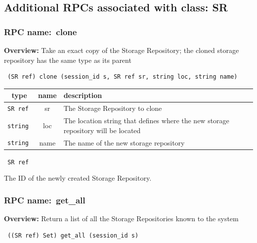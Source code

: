 \subsection{Additional RPCs associated with class: SR}
\subsubsection{RPC name:~clone}

{\bf Overview:} 
Take an exact copy of the Storage Repository;
        the cloned storage repository has the same type as its parent

\begin{verbatim} (SR ref) clone (session_id s, SR ref sr, string loc, string name)\end{verbatim}



 
\vspace{0.3cm}
\begin{tabular}{|c|c|p{7cm}|}
 \hline
{\bf type} & {\bf name} & {\bf description} \\ \hline
{\tt SR ref } & sr & The Storage Repository to clone \\ \hline 

{\tt string } & loc & The location string that defines where the new storage repository will be located \\ \hline 

{\tt string } & name & The name of the new storage repository \\ \hline 

\end{tabular}

\vspace{0.3cm}

{\tt 
SR ref
}


The ID of the newly created Storage Repository.
\vspace{0.3cm}
\vspace{0.3cm}
\vspace{0.3cm}
\subsubsection{RPC name:~get\_all}

{\bf Overview:} 
Return a list of all the Storage Repositories known to the system

\begin{verbatim} ((SR ref) Set) get_all (session_id s)\end{verbatim}


